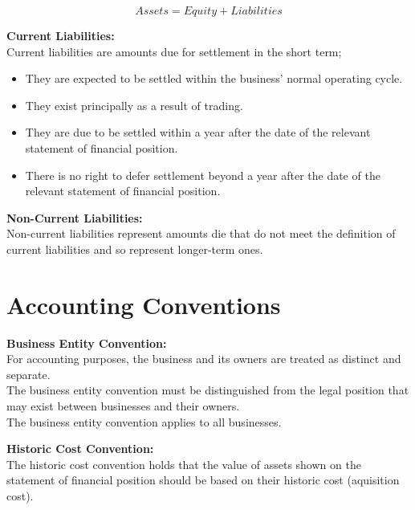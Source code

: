 \documentclass{report}
\newenvironment{blackbox}[1][Black]
  {\begin{tcolorbox}[colframe=#1,colback=white]}
  {\end{tcolorbox}}
\begin{document}
\begin{equation}
    Assets = Equity + Liabilities
\end{equation}

\begin{blackbox}
    \textbf{Current Liabilities:}\\
    Current liabilities are amounts due for settlement in the short term;
    \begin{itemize}
        \item They are expected to be settled within the business' normal operating cycle.
        \item They exist principally as a result of trading.
        \item They are due to be settled within a year after the date of the relevant statement of financial position.
        \item There is no right to defer settlement beyond a year after the date of the relevant statement of financial position. 
    \end{itemize}
\end{blackbox}

\begin{blackbox}
    \textbf{Non-Current Liabilities:}\\
    Non-current liabilities represent amounts die that do not meet the definition of current liabilities and so represent longer-term ones.
\end{blackbox}

\section{Accounting Conventions}

\begin{blackbox}
    \textbf{Business Entity Convention:}\\
    For accounting purposes, the business and its owners are treated as distinct and separate.\\
    The business entity convention must be distinguished from the legal position that may exist between businesses and their owners.\\
    The business entity convention applies to all businesses.
\end{blackbox}

\begin{blackbox}
    \textbf{Historic Cost Convention:}\\
    The historic cost convention holds that the value of assets shown on the statement of financial position should be based on their historic cost (aquisition cost).
\end{blackbox}
\end{document}
